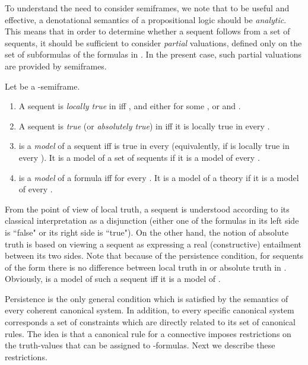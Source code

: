 \documentclass{LMCS}
\theoremstyle{remark}
\newcommand{\be}{\begin{enumerate}[(1)]}
\newcommand{\ee}{\end{enumerate}}
\begin{document}
\begin{rem}
\label{analytic remark}
To understand the need to consider semiframes, we note that 
to be useful and effective, a denotational semantics of 
a propositional logic should be {\em analytic}. 
This means that in order to determine
whether a sequent  follows from a set   of sequents,
it should be sufficient to consider {\em partial} valuations,
defined only on the set of subformulas of the formulas in
. In the present case, such partial valuations are 
provided by semiframes.
\end{rem}

\begin{defi}
\label{sequent-satisfaction} 
Let  be a -semiframe.
\be
\item A sequent  is {\em locally true} in  
iff , and either  for some , or 
 and .
\item A sequent is {\em true} (or {\em absolutely true}) in  iff
it is locally true in every .
\item  is a {\em model} of a sequent  
iff  is true in every  (equivalently, if  is locally true in every ). 
It is a model of a set  of sequents if it is a model of every .
\item  is a {\em model} of a formula  iff  for every . 
It is a model of a theory  if it is a model of every .
\ee
\end{defi}


\begin{rem}
From the point of view of local truth, a sequent 
is understood according to its classical interpretation as a disjunction
(either one of the formulas in its left side is ``false" or its right side is ``true").
On the other hand, the notion of absolute truth is based on viewing 
a sequent as expressing a real (constructive) entailment between its two sides.
Note that because of the persistence condition, 
for sequents of the form  there is no difference between
local truth in  or absolute truth in .
Obviously,  is a model of such a sequent iff it is a model of .
\end{rem}

Persistence is the only general condition which is satisfied by the semantics of
every coherent canonical system.
In addition, to every specific canonical system corresponds a set of constraints 
which are directly related to its set of canonical rules.
The idea is that a canonical rule for a connective 
imposes restrictions on the truth-values that can be 
assigned to -formulas.
Next we describe these restrictions.
\end{document}
